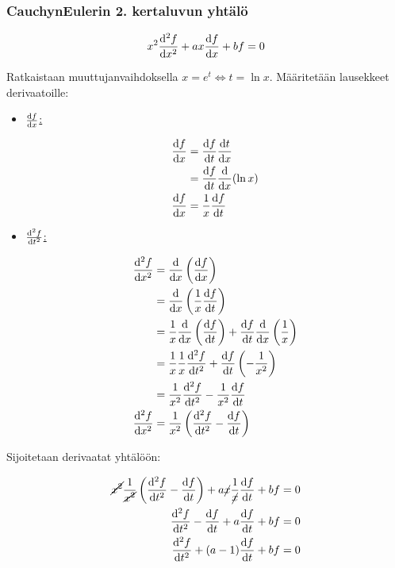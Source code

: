 \documentclass[../johdoksia.tex]{subfiles}
\begin{document}
	\subsubsection{Cauchyn\textendash Eulerin 2. kertaluvun yhtälö}
	
	\begin{equation}
		x^2\odv{^2f}{x^2} + ax\odv{f}{x} + bf = 0
	\end{equation}

	Ratkaistaan muuttujanvaihdoksella $x = e^t \iff t = \ln x$. Määritetään lausekkeet derivaatoille:
	
	\begin{itemize}
		\item \underline{$\odv{f}{x}$:}
		
		\begin{align*}
			\odv{f}{x} &= \odv{f}{t}\odv{t}{x} \\
			&= \odv{f}{t}\odv{}{x}(\ln x) \\
			\odv{f}{x} &= \frac{1}{x}\odv{f}{t}
		\end{align*}
		
		\item \underline{$\odv{^2f}{t^2}$:}
		
		\begin{align*}
			\odv{^2f}{x^2} &= \odv{}{x}\left(\odv{f}{x}\right) \\
			&= \odv{}{x}\left(\frac{1}{x}\odv{f}{t}\right) \\
			&= \frac{1}{x}\odv{}{x}\left(\odv{f}{t}\right) + \odv{f}{t}\odv{}{x}\left(\frac{1}{x}\right) \\
			&= \frac{1}{x}\frac{1}{x}\odv{^2f}{t^2} + \odv{f}{t}\left(-\frac{1}{x^2}\right) \\
			&= \frac{1}{x^2}\odv{^2f}{t^2} - \frac{1}{x^2}\odv{f}{t} \\
			\odv{^2f}{x^2} &= \frac{1}{x^2}\left(\odv{^2f}{t^2} - \odv{f}{t}\right)
		\end{align*}
	\end{itemize}

	Sijoitetaan derivaatat yhtälöön:
	
	\begin{align*}
		\cancel{x^2}\frac{1}{\cancel{x^2}}\left(\odv{^2f}{t^2} - \odv{f}{t}\right) + a\cancel{x}\frac{1}{\cancel{x}}\odv{f}{t} + bf &= 0 \\
		\odv{^2f}{t^2} - \odv{f}{t} + a\odv{f}{t} + bf &= 0 \\
		\odv{^2f}{t^2} + (a - 1)\odv{f}{t} + bf &= 0
	\end{align*}
\end{document}
